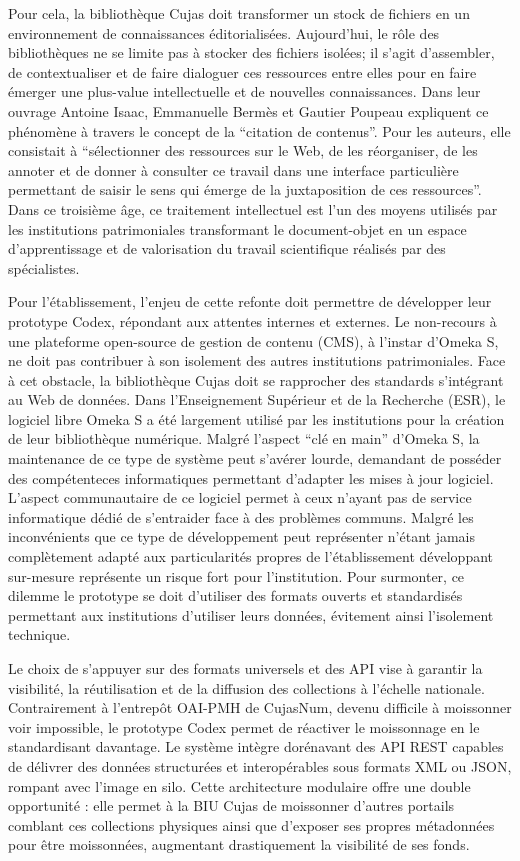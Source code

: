 Pour cela, la bibliothèque Cujas doit transformer un stock de fichiers en un environnement de connaissances éditorialisées. Aujourd'hui, le rôle des bibliothèques ne se limite pas à stocker des fichiers isolées; il s'agit d'assembler, de contextualiser et de faire dialoguer ces ressources entre elles pour en faire émerger une plus-value intellectuelle et de nouvelles connaissances. Dans leur ouvrage Antoine Isaac, Emmanuelle Bermès et Gautier Poupeau expliquent ce phénomène à travers le concept de la \enquote{citation de contenus}. Pour les auteurs, elle consistait à \enquote{sélectionner des ressources sur le Web, de les réorganiser, de les annoter et de donner à consulter ce travail dans une interface particulière permettant de saisir le sens qui émerge de la juxtaposition de ces ressources}. Dans ce troisième âge, ce traitement intellectuel est l'un des moyens utilisés par les institutions patrimoniales transformant le document-objet en un espace d'apprentissage  et de valorisation du travail scientifique réalisés par des spécialistes.

Pour l'établissement, l'enjeu de cette refonte doit permettre de développer leur prototype Codex, répondant aux attentes internes et externes. Le non-recours à une plateforme open-source de gestion de contenu (CMS), à l'instar d'Omeka S, ne doit pas contribuer à son isolement des autres institutions patrimoniales. Face à cet obstacle, la bibliothèque Cujas doit se rapprocher des standards s'intégrant au Web de données. Dans l'Enseignement Supérieur et de la Recherche (ESR), le logiciel libre Omeka S a été largement utilisé par les institutions pour la création de leur bibliothèque numérique. Malgré l'aspect \enquote{clé en main} d'Omeka S, la maintenance de ce type de système peut s'avérer lourde, demandant de posséder des compétenteces informatiques permettant d'adapter les mises à jour logiciel. L'aspect communautaire de ce logiciel permet à ceux n'ayant pas de service informatique dédié de s'entraider face à des problèmes communs. Malgré les inconvénients que ce type de développement peut représenter n'étant jamais complètement adapté aux particularités propres de l'établissement développant sur-mesure représente un risque fort pour l'institution. Pour surmonter, ce dilemme le prototype se doit d'utiliser des formats ouverts et standardisés permettant aux institutions d'utiliser leurs données, évitement ainsi l'isolement technique. 

Le choix de s'appuyer sur des formats universels et des API vise à garantir la visibilité, la réutilisation et de la diffusion des collections à l'échelle nationale. Contrairement à l'entrepôt OAI-PMH de CujasNum, devenu difficile à moissonner voir impossible, le prototype Codex permet de réactiver le moissonnage en le standardisant davantage. Le système intègre dorénavant des API REST capables de délivrer des données structurées et interopérables sous formats XML ou JSON, rompant avec l'image en silo. Cette architecture modulaire offre une double opportunité : elle permet à la BIU Cujas de moissonner d'autres portails comblant ces collections physiques ainsi que d'exposer ses propres métadonnées pour être moissonnées, augmentant drastiquement la visibilité de ses fonds.

